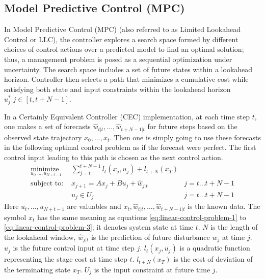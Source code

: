  \subsection{Model Predictive Control (MPC)} 
In Model Predictive Control (MPC) (also referred to as Limited Lookahead Control or LLC)\cite{abdelwahed2004control, kandasamy2004self}, the controller explores a search space formed by different choices of control actions over a predicted model \cite{bhat2006enabling} to find an optimal solution; thus, a management problem is posed as a sequential optimization under uncertainty. 
The search space includes a set of future states within a lookahead horizon. Controller then selects a path that minimizes a cumulative cost while satisfying both state and input constraints within the lookahead horizon
$u^*_j|j\in [t , t + N-1]$. 

In a Certainly Equivalent Controller (CEC)  implementation,  at each time step $t$, one
 makes a set of forecasts $\hat{w}_{t|t} ,\ldots,\hat{w}_{t+N-1|t}$ for future steps based on the observed state trajectory $x_{0},...,x_{t}$. 
 Then one is simply going to use these forecasts in the following optimal control problem as if the forecast were perfect. The first control input leading to this path is chosen as the next control action.
\begin{align} 
    \underset{u_t,...,u_{N+t-1}} {\text{minimize } }  &  \sum_{j=t}^{t+N-1} l_t(x_j,u_j) + l_{t+N}(x_T)  \label{eq:mpc-control-problem-1}   \\ 
    \text{subject to: } 
    & x_{j+1}=A x_{j}+B u_j + \hat{w}_{j|t} & j=t...t+N-1  \label{eq:mpc-control-problem-2}   \\
    & u_j\in U_j   & j=t...t+N-1  \label{eq:mpc-control-problem-3}  
\end{align}        
 Here $u_t,\ldots,u_{N+t-1}$ are valuables and $x_t, \hat{w}_{t|t} ,\ldots,\hat{w}_{t+N-1|t} $  is the known data. The symbol $x_t$ has the same meaning as equations  \ref{eq:linear-control-problem-1}  to \ref{eq:linear-control-problem-3}; it denotes system state at time $t$. $N$ is the length of the lookahead window, $\hat{w}_{j|t}$  is the prediction of future disturbance $w_{j}$ at time $j$. $u_j$ is the future control input at time step $j$. $l_t(x_j,u_j)$ is a quadratic function representing the stage cost at time step $t$. $l_{t+N}(x_T)$ is the cost of deviation of the terminating state $x_T$. $U_j$ is the input constraint at future time $j$.  


